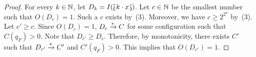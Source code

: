 \begin{proof}
  For every $k \in \mathbb{N}$, let $D_k = I(\Lbag k \cdot x\Rbag)$. Let $c
  \in \mathbb{N}$ be the smallest number such that $O(D_c) = 1$. Such a $c$
  exists by~(3). Moreover, we have $c \geq 2^{2^n}$ by~(3). Let $c'
  \geq c$. Since $O(D_c) = 1$, $D_c \xrightarrow{*} C$ for some
  configuration such that $C(q_F) > 0$. Note that $D_{c'} \geq
  D_c$. Therefore, by monotonicity, there exists $C'$ such that
  $D_{c'} \xrightarrow{*} C'$ and $C'(q_F) > 0$. This implies that
  $O(D_{c'}) = 1$.
\end{proof}
